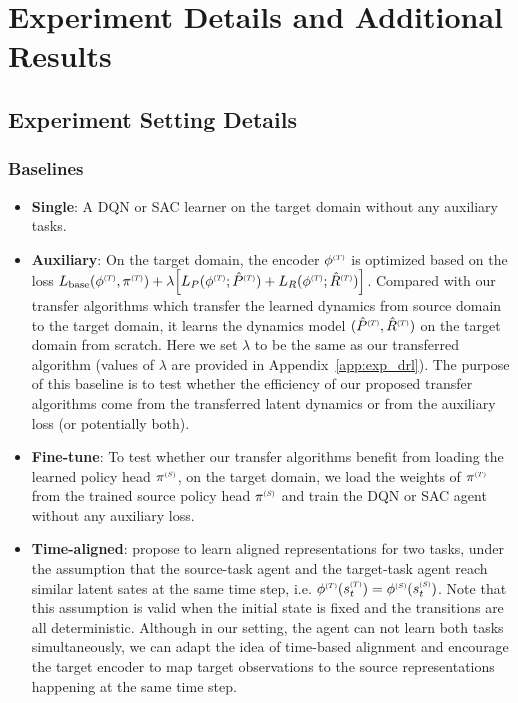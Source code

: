 \section{Experiment Details and Additional Results}
\label{app:exp}

\subsection{Experiment Setting Details}
\label{app:exp_setting}

\subsubsection{Baselines}
\label{app:exp_baseline}
\begin{itemize}
    \item \textbf{Single}: A DQN or SAC learner on the target domain without any auxiliary tasks.
    \item \textbf{Auxiliary}: On the target domain, the encoder $\phi\target$ is optimized based on the loss $L_{\text{base}}(\phi\target, \pi\target) + \lambda \Big[L_P(\phi\target;\hat{P}\target)+ L_R(\phi\target;\hat{R}\target)\Big]$. Compared with our transfer algorithms which transfer the learned dynamics from source domain to the target domain, it learns the dynamics model $(\hat{P}\target, \hat{R}\target)$ on the target domain from scratch. Here we set $\lambda$ to be the same as our transferred algorithm (values of $\lambda$ are provided in Appendix~\ref{app:exp_drl}). The purpose of this baseline is to test whether the efficiency of our proposed transfer algorithms come from the transferred latent dynamics or from the auxiliary loss (or potentially both). 
    \item \textbf{Fine-tune}: To test whether our transfer algorithms benefit from loading the learned policy head $\pi\source$, on the target domain, we load the weights of $\pi\target$ from the trained source policy head $\pi\source$ and train the DQN or SAC agent without any auxiliary loss.
    \item \textbf{Time-aligned}:
    \citet{gupta2017learning} propose to learn aligned representations for two tasks, under the assumption that the source-task agent and the target-task agent reach similar latent sates at the same time step, i.e. $\phi\target(s\target_t)=\phi\source(s\source_t)$. Note that this assumption is valid when the initial state is fixed and the transitions are all deterministic. 
    Although in our setting, the agent can not learn both tasks simultaneously, we can adapt the idea of time-based alignment and encourage the target encoder to map target observations to the source representations happening at the same time step.\\

\end{itemize}
